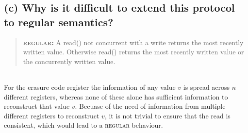 \documentclass{article}
\begin{document}
\begin{adjustwidth}{2em}{2em}
		\subsection*{(c) Why is it difficult to extend this protocol to regular semantics?}
		\begin{adjustwidth}{2em}{2em}
			\begin{quote}
				\textbf{\textsc{regular}:} A read() not concurrent with a write returns the most recently written value. Otherwise read() returns the most recently written value or the concurrently written value.
			\end{quote}
			\hfill \\
			For the erasure code register the information of any value $v$ is spread across $n$ different registers, whereas none of these alone has sufficient information to reconstruct that value $v$. Becuase of the need of information from multiple different registers to reconstruct $v$, it is not trivial to ensure that the read is consistent, which would lead to a \textsc{regular} behaviour.
		\end{adjustwidth}
	\end{adjustwidth}
\end{document}
